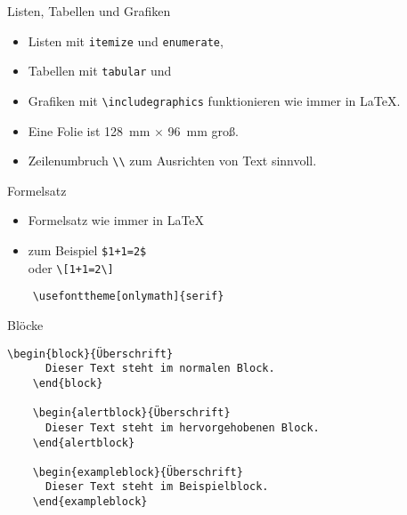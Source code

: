 \begin{Frame}[fragile]{Listen, Tabellen und Grafiken}
  \begin{itemize}
    \item Listen mit \lstinline-itemize- und \lstinline-enumerate-,
    \item Tabellen mit \lstinline-tabular- und
    \item Grafiken mit \lstinline-\includegraphics- funktionieren wie immer in \LaTeX.
  \end{itemize}

  \xxx

  \begin{itemize}
    \item Eine Folie ist 128~mm $\times$ 96~mm groß.
    \item Zeilenumbruch \lstinline-\\- zum Ausrichten von Text sinnvoll.
  \end{itemize}
\end{Frame}

\begin{Frame}[fragile]{Formelsatz}
  \begin{itemize}
    \item Formelsatz wie immer in \LaTeX
    \item zum Beispiel \lstinline-$1+1=2$-\\
      oder \lstinline-\[1+1=2\]-
  \end{itemize}

  \xxx

  \begin{lstlisting}[gobble=4]
    % Formeln mit Serifen setzen
    \usefonttheme[onlymath]{serif}
  \end{lstlisting}
\end{Frame}

\begin{Frame}[fragile]{Blöcke}
  \begin{lstlisting}[gobble=4]
    \begin{block}{Überschrift}
      Dieser Text steht im normalen Block.
    \end{block}

    \begin{alertblock}{Überschrift}
      Dieser Text steht im hervorgehobenen Block.
    \end{alertblock}

    \begin{exampleblock}{Überschrift}
      Dieser Text steht im Beispielblock.
    \end{exampleblock}
  \end{lstlisting}
\end{Frame}

